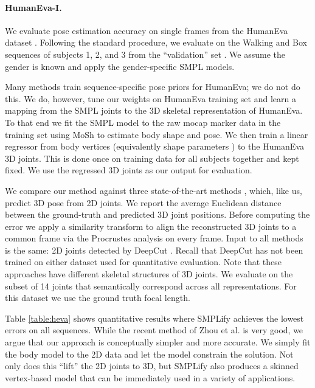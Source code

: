 \documentclass[runningheads]{llncs}
\begin{document}
\paragraph{HumanEva-I.}
We evaluate pose estimation accuracy on single frames from the
HumanEva dataset \cite{HumanEva:2010}.
Following the standard procedure, we evaluate on the
Walking and Box sequences of subjects 1, 2, and 3 from the ``validation''
set \cite{Bo:IJCV10,Tekin:2015}.
We assume the gender is known and apply the gender-specific SMPL models.
 
Many methods train sequence-specific pose priors for HumanEva; we do
not do this.
We do, however, tune our weights on HumanEva training set and learn a
mapping from the SMPL joints to the 3D skeletal representation of HumanEva.
To that end we fit the SMPL model to the raw mocap marker data
in the training set using MoSh to estimate body shape and pose.
We then train a linear regressor from body vertices (equivalently
shape parameters ) to the HumanEva 3D joints.
This is done once on training data for all subjects together and kept
fixed. We use the regressed 3D joints as our output for evaluation.

We compare our method against three state-of-the-art methods
\cite{Akhter:2015,Ramakrishna:2012,Zhou:2015b}, which, like us,
predict 3D pose from 2D joints. We report the average Euclidean distance between the ground-truth and predicted 3D joint
positions. Before computing the error we apply a similarity transform to align the
reconstructed 3D joints to a common frame via the Procrustes analysis
on every frame. 
Input to all methods is the same: 2D joints detected by DeepCut
\cite{Leonid2016DeepCut}.
Recall that DeepCut has not been trained on either dataset used for
quantitative evaluation. Note that these approaches have different skeletal structures of 3D
joints. We evaluate on the subset of 14 joints that semantically correspond
across all representations.
For this dataset we use the ground truth focal length.

Table \ref{table:heva} shows quantitative results where SMPLify achieves the lowest errors on all sequences.
While the recent method of Zhou et al. \cite{Zhou:2015b} is very good,
we argue that our approach is conceptually simpler and more accurate.
We simply fit the body model to the 2D data and let the model
constrain the solution. Not only does this ``lift'' the 2D joints to 3D, but SMPLify also produces a skinned vertex-based model that can
be immediately used in a variety of applications.
\end{document}
